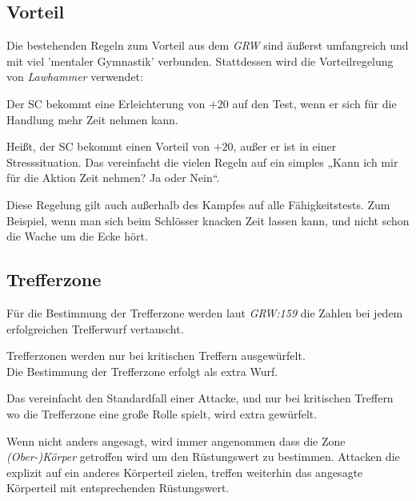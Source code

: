 \documentclass[a4paper,10pt,twoside,twocolumn,openany,bg=none]{dndbook}
\begin{document}
\subsection{Vorteil}
Die bestehenden Regeln zum Vorteil aus dem \textit{GRW} sind äußerst umfangreich und mit viel 'mentaler Gymnastik' verbunden.
Stattdessen wird die Vorteilregelung von \textit{Lawhammer} verwendet:
\begin{DndReadAloud}
  Der SC bekommt eine Erleichterung von $+20$ auf den Test, wenn er sich für die Handlung mehr Zeit nehmen kann.
\end{DndReadAloud}
\noindent
Heißt, der SC bekommt einen Vorteil von $+20$, außer er ist in einer Stresssituation.
Das vereinfacht die vielen Regeln auf ein simples „Kann ich mir für die Aktion Zeit nehmen? Ja oder Nein“. 

Diese Regelung gilt auch außerhalb des Kampfes auf alle Fähigkeitstests. 
Zum Beispiel, wenn man sich beim Schlösser knacken Zeit lassen kann, und nicht schon die Wache um die Ecke hört.

\subsection{Trefferzone}
Für die Bestimmung der Trefferzone werden laut \textit{GRW:159} die Zahlen bei jedem erfolgreichen Trefferwurf vertauscht.
\begin{DndReadAloud}
  Trefferzonen werden nur bei kritischen Treffern ausgewürfelt.\\
  Die Bestimmung der Trefferzone erfolgt als extra Wurf.
\end{DndReadAloud} 
\noindent
Das vereinfacht den Standardfall einer Attacke, und nur bei kritischen Treffern wo die Trefferzone eine große Rolle spielt, wird extra gewürfelt.

Wenn nicht anders angesagt, wird immer angenommen dass die Zone \textit{(Ober-)Körper} getroffen wird um den Rüstungswert zu bestimmen. 
Attacken die explizit auf ein anderes Körperteil zielen, treffen weiterhin das angesagte Körperteil mit entsprechenden Rüstungswert.



\clearpage

\end{document}
